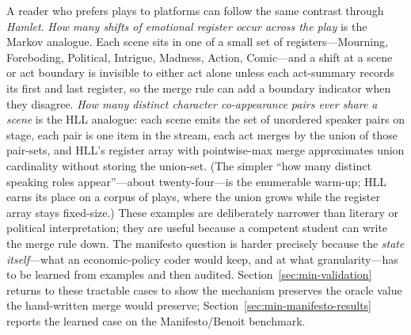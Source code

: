 A reader who prefers plays to platforms can follow the same contrast
through \emph{Hamlet}. \emph{How many shifts of emotional register occur
across the play} is the Markov analogue. Each scene sits in one of a small
set of registers---Mourning, Foreboding, Political, Intrigue, Madness,
Action, Comic---and a shift at a scene or act boundary is invisible to either
act alone unless each act-summary records its first and last register, so the
merge rule can add a boundary indicator when they disagree. \emph{How many
distinct character co-appearance pairs ever share a scene} is the HLL
analogue: each scene emits the set of unordered speaker pairs on stage, each
pair is one item in the stream, each act merges by the union of those
pair-sets, and HLL's register array with
pointwise-max merge approximates union cardinality without storing the
union-set. (The simpler ``how many distinct speaking roles appear''---about
twenty-four---is the enumerable warm-up; HLL earns its place on a corpus of
plays, where the union grows while the register array stays fixed-size.)
These examples are deliberately narrower than literary or political
interpretation; they are useful because a competent student can write the
merge rule down. The manifesto question is harder precisely because the
\emph{state itself}---what an economic-policy coder would keep, and at what
granularity---has to be learned from examples and then audited.
Section~\ref{sec:min-validation} returns to these tractable cases to show
the mechanism preserves the oracle value the hand-written merge would
preserve; Section~\ref{sec:min-manifesto-results} reports the learned case on
the Manifesto/Benoit benchmark.
